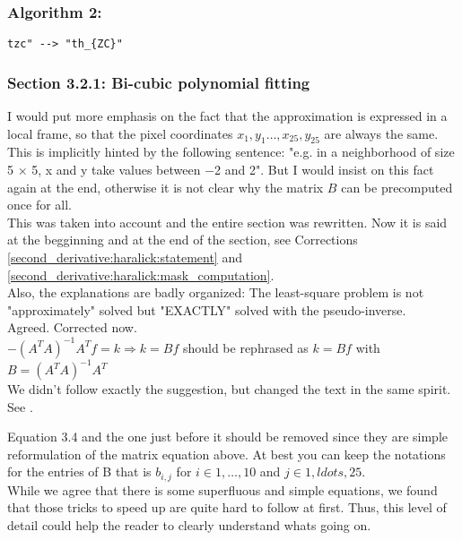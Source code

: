 \documentclass[a4paper,10pt]{report}
\begin{document}
\subsubsection{Algorithm 2:}
\begin{verbatim}
tzc" --> "th_{ZC}"
\end{verbatim}

\subsubsection{ Section 3.2.1: Bi-cubic polynomial fitting}

\que I would put more emphasis on the fact that the approximation is expressed in a
local frame, so that the pixel coordinates $x_1,y_1\dots,x_{25},y_{25}$ are
always the same. This is implicitly hinted by the following sentence:
"e.g. in a neighborhood of size 5 × 5, x and y take values between −2 and 2".
But I would insist on this fact again at the end, otherwise it is not clear why
the matrix $B$ can be precomputed once for all.\\

\ans This was taken into account and the entire section was rewritten. Now it is said at the begginning and at the end of the section, see Corrections \ref{second_derivative:haralick:statement} and \ref{second_derivative:haralick:mask_computation}.\\

Also, the explanations are badly organized:
\que  The least-square problem is not "approximately" solved but "EXACTLY" solved with the pseudo-inverse.\\

\ans Agreed. Corrected now.\\


\que $- (A^TA)^{−1}A^T f=k \Rightarrow k=Bf$ should be rephrased as
$k=Bf$ with $B=(A^TA)^{−1}A^T$\\

\ans We didn't follow exactly the suggestion, but changed the text in the same spirit. See .

\que Equation 3.4 and the one just before it should be removed since they are
simple reformulation of the matrix equation above. At best you can keep the
notations for the entries of B that is $b_{i,j}$ for $i\in {1,\ldots,10}$ and
$j \in {1,ldots,25}$.\\

\ans While we agree that there is some superfluous and simple equations, we found that those tricks to speed up are quite hard to follow at first. Thus, this level of detail could help the reader to clearly understand whats going on.\\
\end{document}
